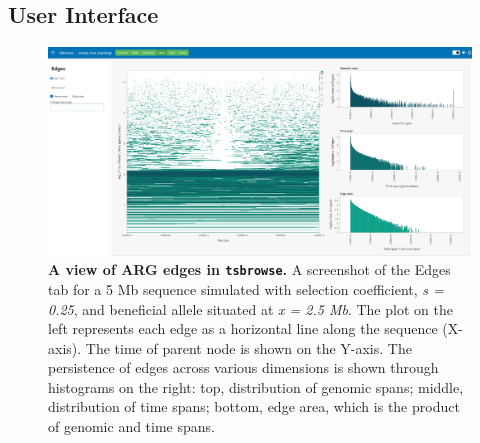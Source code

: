 \documentclass[unnumsec,webpdf,contemporary,large,namedate]{oup-authoring-template}%
\begin{document}
\subsection{User Interface}
\label{subsec:User_Interface}
\begin{figure}
    \centering
    \includegraphics[width=0.95\linewidth]{figures/MainFig2.png}
    \caption{\textbf{A view of ARG edges in \texttt{tsbrowse}.}
    A screenshot of the Edges tab for a 5 Mb sequence simulated with selection coefficient, \textit{s = 0.25}, and beneficial allele situated at \textit{x = 2.5 Mb}. The plot on the left represents each edge as a horizontal line along the sequence (X-axis). The time of parent node is shown on the Y-axis. The persistence of edges across various dimensions is shown through histograms on the right: top, distribution of genomic spans; middle, distribution of time spans; bottom, edge area, which is the product of genomic and time spans.} 

    \label{fig:Figure_2}
\end{figure}
\end{document}
